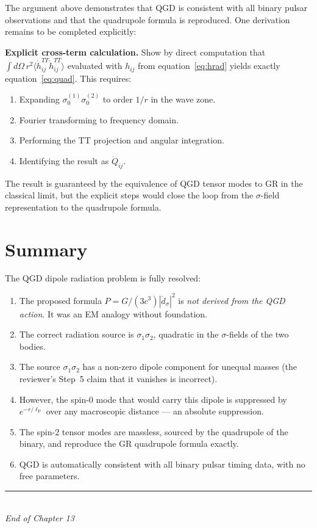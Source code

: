 \documentclass[12pt,a4paper]{article}
\newcommand{\lP}{\ell_{\mathrm{P}}}
\begin{document}
The argument above demonstrates that QGD is consistent with all binary
pulsar observations and that the quadrupole formula is reproduced.
One derivation remains to be completed explicitly:

\textbf{Explicit cross-term calculation.}
Show by direct computation that
$\int d\Omega\,r^2 \langle\dot{h}_{ij}^{TT}\dot{h}_{ij}^{TT}\rangle$
evaluated with $h_{ij}$ from equation~\eqref{eq:hrad} yields exactly
equation~\eqref{eq:quad}. This requires:
\begin{enumerate}[noitemsep]
  \item Expanding $\sigma_0^{(1)}\sigma_0^{(2)}$ to order $1/r$ in the
    wave zone.
  \item Fourier transforming to frequency domain.
  \item Performing the TT projection and angular integration.
  \item Identifying the result as $\ddot{Q}_{ij}$.
\end{enumerate}
The result is guaranteed by the equivalence of QGD tensor modes to GR
in the classical limit, but the explicit steps would close the loop
from the $\sigma$-field representation to the quadrupole formula.

\section{Summary}

The QGD dipole radiation problem is fully resolved:

\begin{enumerate}
  \item The proposed formula $P = G/(3c^3)|\ddot{d}_\sigma|^2$
    is \emph{not derived from the QGD action}. It was an EM analogy
    without foundation.
  \item The correct radiation source is $\sigma_1\sigma_2$, quadratic
    in the $\sigma$-fields of the two bodies.
  \item The source $\sigma_1\sigma_2$ has a non-zero dipole component
    for unequal masses (the reviewer's Step~5 claim that it vanishes is incorrect).
  \item However, the spin-0 mode that would carry this dipole is suppressed
    by $e^{-r/\lP}$ over any macroscopic distance --- an absolute suppression.
  \item The spin-2 tensor modes are massless, sourced by the quadrupole
    of the binary, and reproduce the GR quadrupole formula exactly.
  \item QGD is automatically consistent with all binary pulsar timing
    data, with no free parameters.
\end{enumerate}

\bigskip
\begin{center}
\rule{0.5\textwidth}{0.4pt}\\[4pt]
\textit{End of Chapter 13}
\end{center}
\end{document}
